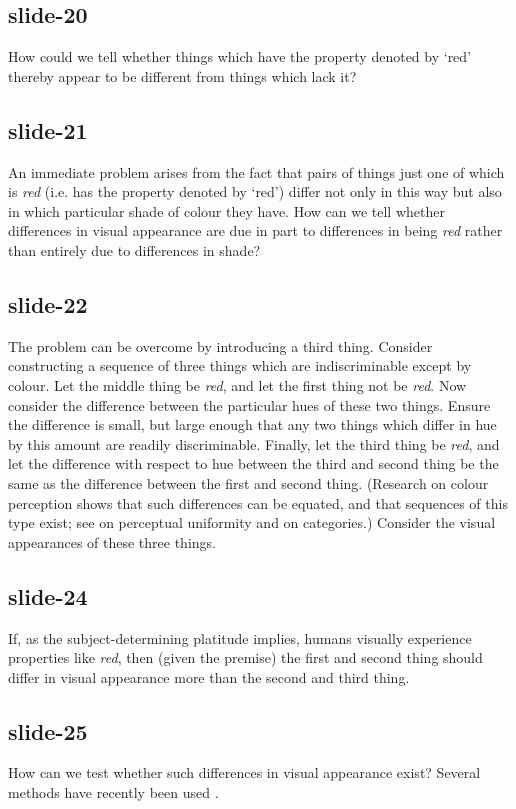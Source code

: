\documentclass[12pt,\papersize]{extarticle}
\begin{document}
\subsection{slide-20}
How could we tell whether
things which have the property denoted by ‘red’ thereby appear to be different from things which lack it?

\subsection{slide-21}
An immediate problem arises from the fact that pairs of things  just one of which is \emph{red} (i.e. has the property denoted by ‘red’) differ not only in this way but also in which particular shade of colour they have.
How can we tell whether differences in visual appearance are due in part to differences in being \emph{red} rather than entirely due to differences in shade?

\subsection{slide-22}
The problem can be overcome by introducing a third thing.  Consider constructing a sequence of three things which are indiscriminable except by colour.  Let the middle thing be \emph{red}, and let the first thing not be \emph{red}.  Now consider the difference between the particular hues of these two things.  Ensure the difference is small, but large enough that any two things which differ in hue by this amount are readily discriminable.
Finally, let the third thing be \emph{red}, and let the difference with respect to hue between the third and second thing be the same as the difference between the first and second thing.  (Research on colour perception shows that such differences can be equated, and that sequences of this type exist; see
\citealp{kuehni:2001_color} on perceptual uniformity and \citealp{witzel:2013_categorical} on categories.)
Consider the visual appearances of these three things.

\subsection{slide-24}
If, as the subject-determining platitude implies, humans visually experience properties like \emph{red}, then (given the premise) the first and second thing should differ in visual appearance more than the second and third thing.

\subsection{slide-25}
How can we test whether such differences in visual appearance  exist?
Several methods have recently been used \citep{witzel2014category,webster:2012_color,davidoff:2012_perceptual}. %
\end{document}
